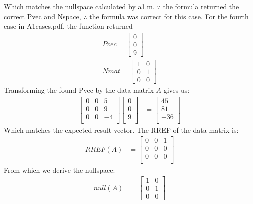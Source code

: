 \documentclass{article}
\begin{document}
	Which matches the nullspace calculated by a1.m. $\because$ the formula returned the correct Pvec and Nspace, $\therefore$ the formula was correct for this case. For the fourth case in A1cases.pdf, the function returned
		\begin{align*}
			Pvec = \left[\begin{matrix}
				0\\
				0\\
				9
			\end{matrix}\right]\\
			Nmat = \left[\begin{matrix}
				1 & 0\\
				0 & 1\\
				0 & 0
			\end{matrix}\right]
		\end{align*}
	Transforming the found Pvec by the data matrix $A$ gives us:
		\begin{align*}
			\left[\begin{matrix}
				0 & 0 & 5\\
				0 & 0 & 9\\
				0 & 0 & -4\\
			\end{matrix}\right]\left[\begin{matrix}
				0\\
				0\\
				9\\
			\end{matrix}\right] &= \left[\begin{matrix}
				45\\
				81\\
				-36\\
			\end{matrix}\right]
		\end{align*}
	Which matches the expected result vector. The RREF of the data matrix is:
		\begin{align*}
			RREF(A) &= \left[\begin{matrix}
				0 & 0 & 1\\
				0 & 0 & 0\\
				0 & 0 & 0\\
			\end{matrix}\right]
		\end{align*}
	From which we derive the nullspace:
		\begin{align*}
			null(A) &= \left[\begin{matrix}	
				1 & 0\\
				0 & 1\\
				0 & 0
			\end{matrix}\right]
		\end{align*}
\end{document}
